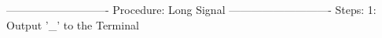 ----------------------------
Procedure: Long Signal
----------------------------
Steps:
1: Output '_' to the Terminal
